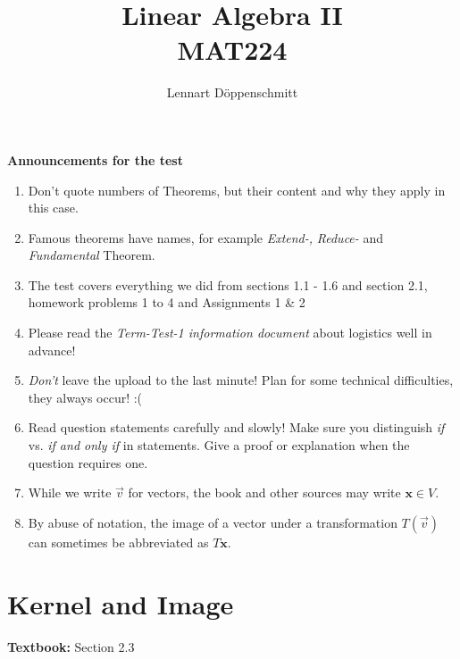 \documentclass[letterpaper, 10pt]{article}
\begin{document}

\title{Linear Algebra II \\ \Large{MAT224}}
\author{Lennart Döppenschmitt}



\lb
\textbf{Announcements for the test} 
\begin{enumerate}
    \item Don't quote numbers of Theorems, but their content and why they apply in this case.
    \item Famous theorems have names, for example \emph{Extend-,} \emph{Reduce-} and \emph{Fundamental} Theorem.

    \item The test covers everything we did from sections 1.1 - 1.6 and section 2.1,
        homework problems 1 to 4 and Assignments 1 \& 2

    \item Please read the \emph{Term-Test-1 information document} about logistics
        well in advance!
    \item \emph{Don't} leave the upload to the last minute!
        Plan for some technical difficulties, they always occur! :(

    \item
        Read question statements carefully and slowly! Make sure you distinguish \emph{if} vs.
        \emph{if and only if} in statements. Give a proof or explanation when the question
        requires one.
    \item
        While we write $\vec v$ for vectors, the book and other sources may write
        $\textbf{x} ∈ V$.
    \item
        By abuse of notation, the image of a vector under a transformation $T(\vec v)$ can
        sometimes be abbreviated as $T \textbf{x} $.

\end{enumerate}



\vspace{100pt}
\section*{Kernel and Image}%
\textbf{Textbook:} Section 2.3
\end{document}
